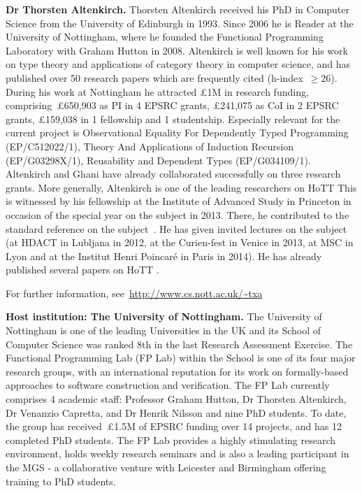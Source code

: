 \documentclass[a4paper,11pt]{article}
\begin{document}
\textbf{Dr Thorsten Altenkirch.}  Thorsten Altenkirch received his PhD in
Computer Science from the University of Edinburgh in 1993. Since 2006
he is Reader at the University of Nottingham,
where he founded the Functional Programming Laboratory with Graham
Hutton in 2008. Altenkirch is well known for his work on type theory
and applications of category theory in computer science, and has
published over 50 research papers which are frequently cited (h-index~$\geq 26$). During his
work at Nottingham he attracted \pounds 1M in research funding,
comprising~\pounds650,903 as PI in 4 EPSRC grants, \pounds241,075 as
CoI in 2 EPSRC grants, \pounds159,038 in 1 fellowship and 1
studentship. Especially relevant for the current project is
Observational Equality For Dependently Typed Programming
(EP/C512022/1), Theory And Applications of Induction Recursion
(EP/G03298X/1), Reusability and Dependent Types
(EP/G034109/1). Altenkirch and Ghani have already collaborated
successfully on three research grants. More generally, 
Altenkirch is one of the leading researchers on HoTT
This is witnessed by his fellowship at the Institute of Advanced Study
in Princeton in occasion of the special year on the subject in 2013. There, he contributed to the standard reference on the
subject~\cite{hott-book}.  He has given invited lectures on the
subject (at HDACT in Lubljana in 2012, at the Curien-fest in Venice in
2013, at MSC in Lyon and at the Institut Henri Poincar\'e in Paris in
2014). He has already published several papers on HoTT
\cite{altenkirch:extSetoids,alti:ott-conf,alti:csl12,alti:tlca13-hedberg}.

For further information, see~\url{http://www.cs.nott.ac.uk/~txa}

\textbf{Host institution: The University of Nottingham.}  The
University of Nottingham is one of the leading Universities in the UK
and its School of Computer Science was ranked 8th in the last Research
Assessment Exercise. The Functional Programming Lab (FP Lab) within the School
is one of its four major research groups, with an international
reputation for its work on formally-based approaches to software
construction and verification.  The FP Lab currently comprises 4
academic staff: Professor Graham Hutton, Dr Thorsten Altenkirch, Dr
Venanzio Capretta, and Dr Henrik Nilsson and nine PhD students.  To
date, the group has received~\pounds1.5M of EPSRC funding over 14
projects, and has 12 completed PhD students.  The FP Lab provides a highly stimulating research environment,
holds weekly research seminars and is also a leading participant in the MGS - a
collaborative venture with Leicester and Birmingham offering training
to PhD students.
\noindent
\end{document}
